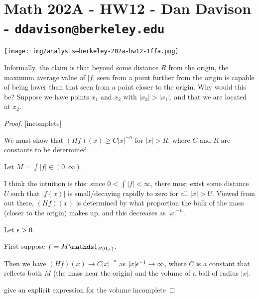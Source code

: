 \section*{Math 202A - HW12 - Dan Davison - \texttt{ddavison@berkeley.edu}}



\begin{mdframed}
\texttt{[image: img/analysis--berkeley-202a-hw12-1ffa.png]}
\end{mdframed}

Informally, the claim is that beyond some distance $R$ from the origin, the maximum average value of $|f|$ seen
from a point further from the origin is capable of being lower than that seen from a point closer to the
origin. Why would this be? Suppose we have points $x_1$ and $x_2$ with $|x_2| > |x_1|$, and that we are located
at $x_2$.





\begin{proof}

  [incomplete]

  We must show that $(H f)(x) \geq C|x|^{-n}$ for $|x| > R$, where $C$ and $R$ are constants to be determined.

  Let $M = \int |f| \in (0, \infty)$.

  I think the intuition is this: since $0 < \int |f| < \infty$, there must exist some distance $U$ such
  that $|f(x)|$ is small/decaying rapidly to zero for all $|x| > U$. Viewed from out there, $(H f)(x)$ is
  determined by what proportion the bulk of the mass (closer to the origin) makes up, and this decreases
  as $|x|^{-n}$.

  Let $\epsilon > 0$.

  First suppose $f = M\ind_{B(\mathbf{0}, \eps)}$.

  Then we have $(H f)(x) \to C|x|^{-n}$ as $|x|\epsilon^{-1} \to \infty$, where $C$ is a constant that reflects
  both $M$ (the mass near the origin) and the volume of a ball of radius $|x|$.

   give an explicit expression for the volume
   incomplete
\end{proof}

